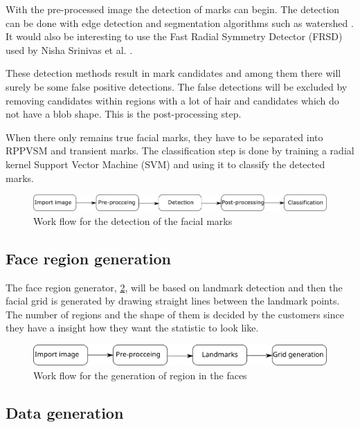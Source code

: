 With the pre-processed image the detection of marks can begin. The detection can be done with edge detection and segmentation algorithms such as watershed \cite{segmentation_method, edge_method}. It would also be interesting to use the Fast Radial Symmetry Detector (FRSD) used by Nisha Srinivas et al. \cite{automatic_detector_2015}. 

These detection methods result in mark candidates and among them there will surely be some false positive detections. The false detections will be excluded by removing candidates within regions with a lot of hair and candidates which do not have a blob shape. This is the post-processing step. \cite{automatic_detector_2015}

When there only remains true facial marks, they have to be separated into RPPVSM and transient marks. The classification step is done by training a radial kernel Support Vector Machine (SVM) and using it to classify the detected marks.  

\begin{figure}[H]
\centering
\includegraphics[width=1.0\linewidth]{"bilder/detection_flow"}
\caption{Work flow for the detection of the facial marks}
\label{fig:detection_flow}
\end{figure}

\subsection{Face region generation}

The face region generator, \cref{fig:grid_flow}, will be based on landmark detection and then the facial grid is generated by drawing straight lines between the landmark points. \cite{landmarks_SVM,landmarks_wild} The number of regions and the shape of them is decided by the customers since they have a insight how they want the statistic to look like. 

\begin{figure}[H]
	\centering
	\includegraphics[width=1.0\linewidth]{"bilder/Grid_flow"}
	\caption{Work flow for the generation of region in the faces}
	\label{fig:grid_flow}
\end{figure}

\subsection{Data generation}

